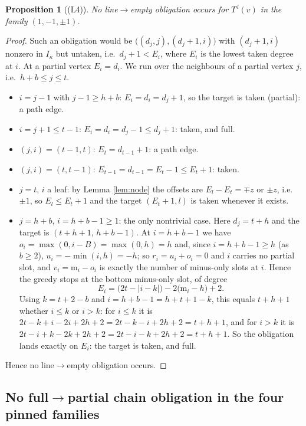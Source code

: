 \documentclass[reqno]{amsart}
\theoremstyle{plain}
\newtheorem{proposition}[theorem]{Proposition}
\theoremstyle{definition}
\newcommand{\ka}{\kappa}
\newcommand{\ms}{\mathrm{m}}
\begin{document}
\begin{proposition}[\textup{(L4)}]\label{prop:L4}
No line$\to$empty obligation occurs for $T^{\,l}(v)$ in the family
$(1,-1,\pm1)$.
\end{proposition}

\begin{proof}
Such an obligation would be $\bigl((d_j,j),(d_j+1,i)\bigr)$ with $(d_j+1,i)$
nonzero in $I_\ka$ but untaken, i.e.\ $d_j+1<E_i$, where
$E_i$ is the lowest taken degree at $i$.  At a partial vertex
$E_i=d_i$.  We run over the neighbours of a partial vertex $j$, i.e.\
$h+b\le j\le t$.
\begin{itemize}\itemsep1pt
\item $i=j-1$ with $j-1\ge h+b$: $E_i=d_i=d_j+1$, so the target is
taken (partial): a path edge.
\item $i=j+1\le t-1$: $E_i=d_i=d_j-1\le d_j+1$: taken, and full.
\item $(j,i)=(t-1,t)$: $E_t=d_{t-1}+1$: a path edge.
\item $(j,i)=(t,t-1)$: $E_{t-1}=d_{t-1}=E_t-1\le E_t+1$: taken.
\item $j=t$, $i$ a leaf: by Lemma \ref{lem:node} the offsets are
$E_l-E_t=\mp z$ or $\pm z$, i.e.\ $\pm1$, so $E_l\le E_t+1$ and the target
$(E_t+1,l)$ is taken whenever it exists.
\item $j=h+b$, $i=h+b-1\ge1$: the only nontrivial case.  Here $d_j=t+h$ and the
target is $(t+h+1,\,h+b-1)$.  At $i=h+b-1$ we have
$o_i=\max(0,i-B)=\max(0,h)=h$ and, since $i=h+b-1\ge h$ (as $b\ge2$),
$u_i=-\min(i,h)=-h$; so $r_i=u_i+o_i=0$ and $i$ carries no partial slot, and
$v_i=\ms_i-o_i$ is exactly the number of minus-only slots at $i$.  Hence the
greedy stops at the bottom minus-only slot, of degree
\[
   E_i=\bigl(2t-|i-k|\bigr)-2\bigl(\ms_i-h\bigr)+2 .
\]
Using $k=t+2-b$ and $i=h+b-1=h+t+1-k$, this equals $t+h+1$ whether $i\le k$ or
$i>k$: for $i\le k$ it is $2t-k+i-2i+2h+2=2t-k-i+2h+2=t+h+1$, and for $i>k$ it
is $2t-i+k-2k+2h+2=2t-i-k+2h+2=t+h+1$.  So the obligation lands exactly on
$E_i$: the target is taken, and full.
\end{itemize}
Hence no line$\to$empty obligation occurs.
\end{proof}

\subsection{No full\texorpdfstring{$\to$}{->}partial chain obligation in the
four pinned families}\label{ss:L5}
\end{document}
